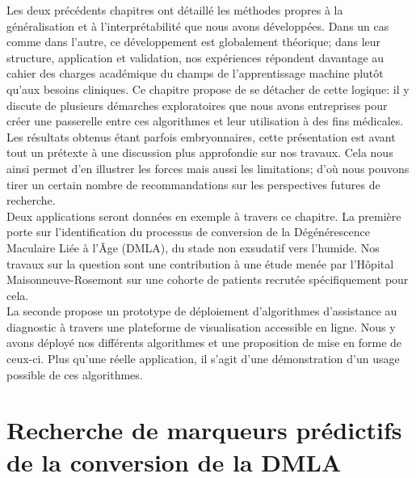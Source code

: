 \label{sec:Theme3}

Les deux précédents chapitres ont détaillé les méthodes propres à la généralisation et à l'interprétabilité que nous avons développées.
Dans un cas comme dans l'autre, ce développement est globalement théorique; dans leur structure, application et validation, nos expériences répondent davantage au cahier des charges académique du champs de l'apprentissage machine plutôt qu'aux besoins cliniques. Ce chapitre propose de se détacher de cette logique: il y discute de plusieurs démarches exploratoires que nous avons entreprises pour créer une passerelle entre ces algorithmes et leur utilisation à des fins médicales. Les résultats obtenus étant parfois embryonnaires, cette présentation est avant tout un prétexte à une discussion plus approfondie sur nos travaux. Cela nous ainsi permet d'en illustrer les forces mais aussi les limitations; d'où nous pouvons tirer un certain nombre de recommandations sur les perspectives futures de recherche.
\\
Deux applications seront données en exemple à travers ce chapitre. La première porte sur l'identification du processus de conversion de la Dégénérescence Maculaire Liée à l'Âge (DMLA), du stade non exsudatif vers l'humide. Nos travaux sur la question sont une contribution à une étude menée par l'Hôpital Maisonneuve-Rosemont sur une cohorte de patients recrutée spécifiquement pour cela. \\
La seconde propose un prototype de déploiement d'algorithmes d'assistance au diagnostic à travers une plateforme de visualisation accessible en ligne. Nous y avons déployé nos différents algorithmes et une proposition de mise en forme de ceux-ci. Plus qu'une réelle application, il s'agit d'une démonstration d'un usage possible de ces algorithmes.

\section{Recherche de marqueurs prédictifs de la conversion de la \ac{DMLA}}
 
